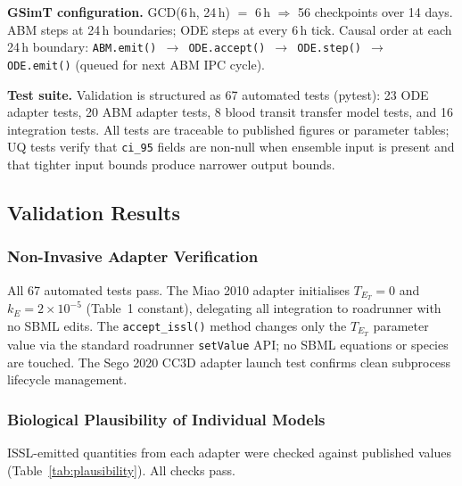 \documentclass[conference,letterpaper,10pt]{IEEEtran}
\begin{document}
\textbf{GSimT configuration.} GCD(6\,h, 24\,h) $=$ 6\,h $\Rightarrow$ 56
checkpoints over 14 days. ABM steps at 24\,h boundaries; ODE steps at
every 6\,h tick. Causal order at each 24\,h boundary:
\texttt{ABM.emit() $\to$ ODE.accept() $\to$ ODE.step() $\to$
ODE.emit()} (queued for next ABM IPC cycle).

\textbf{Test suite.} Validation is structured as 67 automated tests
(pytest): 23 ODE adapter tests, 20 ABM adapter tests, 8 blood transit
transfer model tests, and 16 integration tests. All tests are
traceable to published figures or parameter tables; UQ tests verify
that \texttt{ci\_95} fields are non-null when ensemble input is
present and that tighter input bounds produce narrower output bounds.

\subsection{Validation Results}

\subsubsection{Non-Invasive Adapter Verification}
All 67 automated tests pass. The Miao 2010 adapter initialises
$T_{E_T}=0$ and $k_E=2{\times}10^{-5}$ (Table~1 constant), delegating
all integration to roadrunner with no SBML edits. The
\texttt{accept\_issl()} method changes only the $T_{E_T}$ parameter
value via the standard roadrunner \texttt{setValue} API; no SBML
equations or species are touched. The Sego 2020 CC3D adapter launch
test confirms clean subprocess lifecycle management.

\subsubsection{Biological Plausibility of Individual Models}
ISSL-emitted quantities from each adapter were checked against
published values (Table~\ref{tab:plausibility}). All checks pass.
\end{document}

